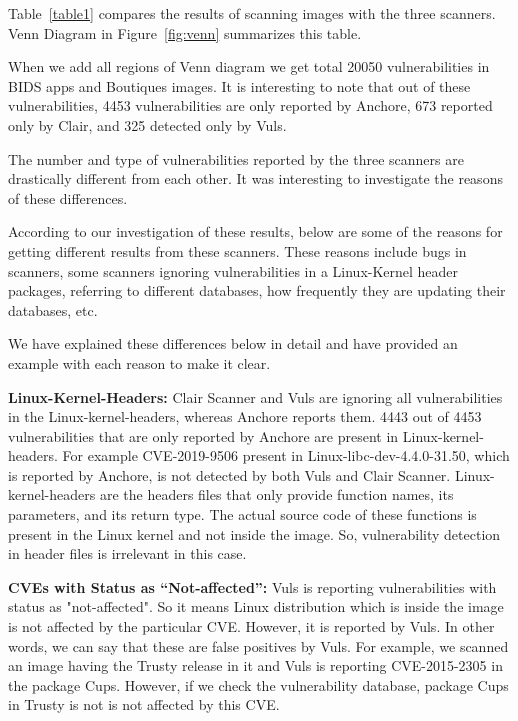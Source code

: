 \documentclass[a4paper,num-refs]{oup-contemporary}
\begin{document}
Table~\ref{table1} compares the results of scanning images with the three scanners.
Venn Diagram in Figure~\ref{fig:venn} summarizes this table. 

When we add all regions of Venn diagram
we get total 20050 vulnerabilities in BIDS apps and Boutiques images.
It is interesting to note that out of these vulnerabilities, 4453 vulnerabilities are only
reported by Anchore, 673 reported only by Clair, and 325 detected only by Vuls.

The number and type of vulnerabilities reported by the three scanners are drastically different from each other.
It was interesting to investigate the reasons of these differences.

According to our investigation of these results, below are some of the reasons for
getting different results from these scanners. These reasons include bugs in scanners,
some scanners ignoring vulnerabilities in a Linux-Kernel header packages, referring to different databases,
how frequently they are updating their databases, etc. 

We have explained these differences below in detail
and have provided an example with each reason to make it clear.

\textbf{Linux-Kernel-Headers:} Clair Scanner and Vuls are ignoring all vulnerabilities in the Linux-kernel-headers,
whereas Anchore reports them.
4443 out of 4453 vulnerabilities that are only reported by Anchore are present in Linux-kernel-headers.
For example CVE-2019-9506 present in Linux-libc-dev-4.4.0-31.50, which is reported by Anchore, is not
detected by both Vuls and Clair Scanner.
Linux-kernel-headers are the headers files that only provide function names, its parameters, and its
return type.
The actual source code of these functions is present in the Linux kernel and not inside the image.
So, vulnerability detection in header files
is irrelevant in this case.

\textbf{CVEs with Status as “Not-affected”:} Vuls is reporting vulnerabilities with status
as "not-affected". So it means Linux distribution which is inside the image is not affected
by the particular CVE. However, it is reported by Vuls. In other words, we can say that
these are false positives by Vuls.
For example, we scanned an image having the Trusty release in it and Vuls is reporting CVE-2015-2305
in the package Cups. However, if we check the vulnerability database, package Cups in Trusty is not
is not affected by this CVE.
\end{document}
